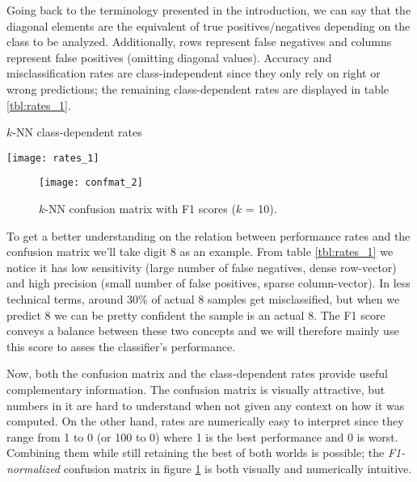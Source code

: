Going back to the terminology presented in the introduction, we can say that the diagonal elements are the equivalent of true positives/negatives depending on the class to be analyzed. Additionally, rows represent false negatives and columns represent false positives (omitting diagonal values). Accuracy and misclassification rates are class-independent since they only rely on right or wrong predictions; the remaining class-dependent rates are displayed in table \ref{tbl:rates_1}.
\begin{table}[]
	\caption{$k$-NN class-dependent rates}
	\label{tbl:rates_1}
	\centering
	\texttt{[image: rates\_1]}
\end{table}
\begin{figure}
	\centering
	\texttt{[image: confmat\_2]}
	\caption{$k$-NN confusion matrix with F1 scores ($k$ = 10).}
	\label{fig:confmat_2}
\end{figure}

To get a better understanding on the relation between performance rates and the confusion matrix we'll take digit 8 as an example. From table \ref{tbl:rates_1} we notice it has low sensitivity (large number of false negatives, dense row-vector) and high precision (small number of false positives, sparse column-vector). In less technical terms, around 30\% of actual 8 samples get misclassified, but when we predict 8 we can be pretty confident the sample is an actual 8. The F1 score conveys a balance between these two concepts and we will therefore mainly use this score to asses the classifier's performance.

Now, both the confusion matrix and the class-dependent rates provide useful complementary information. The confusion matrix is visually attractive, but numbers in it are hard to understand when not given any context on how it was computed. On the other hand, rates are numerically easy to interpret since they range from 1 to 0 (or 100 to 0) where 1 is the best performance and 0 is worst. Combining them while still retaining the best of both worlds is possible; the \textit{F1-normalized} confusion matrix in figure \ref{fig:confmat_2} is both visually and numerically intuitive.

